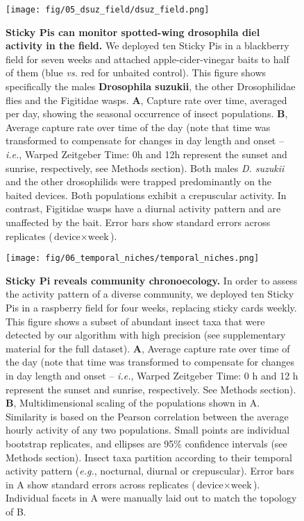 \documentclass[12pt]{article}
\begin{document}
	\pagebreak
	
	\begin{figure}[ht]
		\centering
		\texttt{[image: fig/05\_dsuz\_field/dsuz\_field.png]}
		\caption{\textbf{Sticky Pis can monitor spotted-wing drosophila diel activity in the field.} We deployed ten Sticky Pis in a blackberry field for seven weeks and attached apple-cider-vinegar baits to half of them (blue \emph{vs.} red for unbaited control). This figure shows specifically the males \textbf{Drosophila suzukii}, the other Drosophilidae flies and the Figitidae wasps. \textbf{A}, Capture rate over time, averaged per day, showing the seasonal occurrence of insect populations. \textbf{B}, Average capture rate over time of the day (note that time was transformed to compensate for changes in day length and onset – \emph{i.e.}, Warped Zeitgeber Time: 0h and 12h represent the sunset and sunrise, respectively, see Methods section). Both males \emph{D. suzukii} and the other drosophilids were trapped predominantly on the baited devices. Both populations exhibit a crepuscular activity. In contrast, Figitidae wasps have a diurnal activity pattern and are unaffected by the bait. Error bars show standard errors across replicates ($\text{device} \times{} \text{week}$).}
		\label{fig:05}
	\end{figure}
	
	\pagebreak
	
	\begin{figure}[ht]
		\centering
		\texttt{[image: fig/06\_temporal\_niches/temporal\_niches.png]}
		\caption{\textbf{Sticky Pi reveals community chronoecology.} In order to assess the activity pattern of a diverse community, we deployed ten Sticky Pis in a raspberry field for four weeks, replacing sticky cards weekly. This figure shows a subset of abundant insect taxa that were detected by our algorithm with high precision (see supplementary material for the full dataset). \textbf{A}, Average capture rate over time of the day (note that time was transformed to compensate for changes in day length and onset – \emph{i.e.}, Warped Zeitgeber Time: 0 h and 12 h represent the sunset and sunrise, respectively. See Methods section). \textbf{B}, Multidimensional scaling of the populations shown in A. Similarity is based on the Pearson correlation between the average hourly activity of any two populations. Small points are individual bootstrap replicates, and ellipses are 95\% confidence intervals (see Methods section). Insect taxa partition according to their temporal activity pattern (\emph{e.g.}, nocturnal, diurnal or crepuscular). Error bars in A show standard errors across replicates ($\text{device} \times{} \text{week}$). Individual facets in A were manually laid out to match the topology of B.}
		\label{fig:06}
	\end{figure}
	\pagebreak
	
\end{document}
